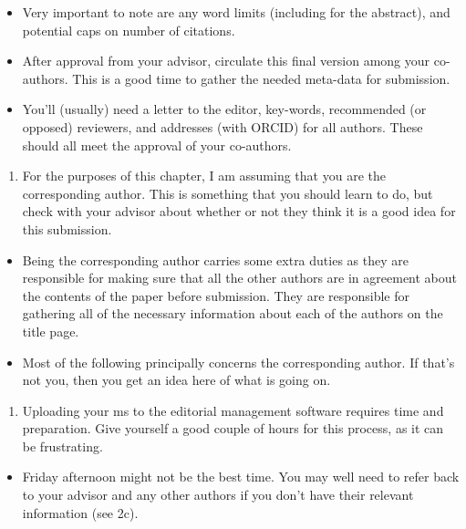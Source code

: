 \documentclass[
]{krantz}
\providecommand{\tightlist}{%
  \setlength{\itemsep}{0pt}\setlength{\parskip}{0pt}}
\begin{document}
\begin{itemize}
\tightlist
\item
  Very important to note are any word limits (including for the abstract), and potential caps on number of citations.
\item
  After approval from your advisor, circulate this final version among your co-authors. This is a good time to gather the needed meta-data for submission.
\item
  You'll (usually) need a letter to the editor, key-words, recommended (or opposed) reviewers, and addresses (with ORCID) for all authors. These should all meet the approval of your co-authors.
\end{itemize}

\begin{enumerate}
\def\labelenumi{\arabic{enumi}.}
\tightlist
\item
  For the purposes of this chapter, I am assuming that you are the corresponding author. This is something that you should learn to do, but check with your advisor about whether or not they think it is a good idea for this submission.
\end{enumerate}

\begin{itemize}
\tightlist
\item
  Being the corresponding author carries some extra duties as they are responsible for making sure that all the other authors are in agreement about the contents of the paper before submission. They are responsible for gathering all of the necessary information about each of the authors on the title page.
\item
  Most of the following principally concerns the corresponding author. If that's not you, then you get an idea here of what is going on.
\end{itemize}

\begin{enumerate}
\def\labelenumi{\arabic{enumi}.}
\tightlist
\item
  Uploading your ms to the editorial management software requires time and preparation. Give yourself a good couple of hours for this process, as it can be frustrating.
\end{enumerate}

\begin{itemize}
\tightlist
\item
  Friday afternoon might not be the best time. You may well need to refer back to your advisor and any other authors if you don't have their relevant information (see 2c).
\end{itemize}
\end{document}
